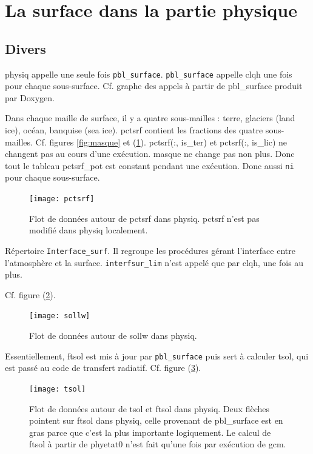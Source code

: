 \documentclass[a4paper,english,french]{article}
\begin{document}
\section{La surface dans la partie physique}

\subsection{Divers}

physiq appelle une seule fois \verb+pbl_surface+. \verb+pbl_surface+
appelle clqh une fois pour chaque sous-surface. Cf. graphe des appels à
partir de pbl\_surface produit par Doxygen.

Dans chaque maille de surface, il y a quatre sous-mailles : terre,
glaciers (land ice), océan, banquise (sea ice). pctsrf contient les
fractions des quatre sous-mailles.  Cf. figures \ref{fig:masque} et
(\ref{fig:pctsrf}). pctsrf(:, is\_ter) et pctsrf(:, is\_lic) ne
changent pas au cours d'une exécution. masque ne change pas non
plus. Donc tout le tableau pctsrf\_pot est constant pendant une
exécution. Donc aussi \verb+ni+ pour chaque sous-surface.

\begin{figure}
  \centering
  \texttt{[image: pctsrf]}
  \caption[Flot de données autour de pctsrf dans physiq]{Flot de
    données autour de pctsrf dans physiq. pctsrf n'est pas modifié
    dans physiq localement.}
  \label{fig:pctsrf}
\end{figure}

Répertoire \verb+Interface_surf+. Il regroupe les procédures gérant
l'interface entre l'atmosphère et la surface. \verb+interfsur_lim+
n'est appelé que par clqh, une fois au plus.

Cf. figure (\ref{fig:sollw}).
\begin{figure}
  \centering
  \texttt{[image: sollw]}
  \caption{Flot de données autour de sollw dans physiq.}
  \label{fig:sollw}
\end{figure}

Essentiellement, ftsol est mis à jour par \verb+pbl_surface+ puis sert
à calculer tsol, qui est passé au code de transfert
radiatif. Cf. figure (\ref{fig:tsol}).
\begin{figure}
  \centering
  \texttt{[image: tsol]}
  \caption[Flot de données autour de tsol et ftsol dans physiq]{Flot
    de données autour de tsol et ftsol dans physiq. Deux flèches
    pointent sur ftsol dans physiq, celle provenant de pbl\_surface
    est en gras parce que c'est la plus importante logiquement. Le
    calcul de ftsol à partir de phyetat0 n'est fait qu'une fois par
    exécution de gcm.}
  \label{fig:tsol}
\end{figure}
\end{document}
